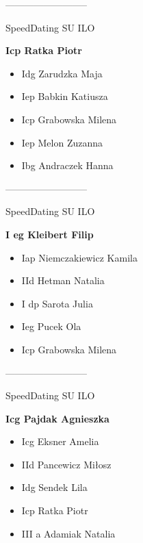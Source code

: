\documentclass[a4paper,10pt]{article}
\begin{document}
\begin{multicols}{3}
\begin{minipage}[l]{\textwidth}
--------------------------

  \footnotesize{SpeedDating SU ILO}

  \bfseries{Icp Ratka Piotr}

  \begin{itemize}
    \item Idg Zarudzka Maja
    \item Iep Babkin Katiusza
    \item Icp Grabowska Milena
    \item Iep Melon Zuzanna
    \item Ibg Andraczek Hanna

    \end{itemize}



\end{minipage}



\begin{minipage}[l]{\textwidth}
--------------------------

  \footnotesize{SpeedDating SU ILO}

  \bfseries{I eg Kleibert Filip}

  \begin{itemize}
    \item Iap Niemczakiewicz Kamila
    \item IId Hetman Natalia
    \item I dp Sarota Julia
    \item Ieg Pucek Ola
    \item Icp Grabowska Milena

    \end{itemize}



\end{minipage}



\begin{minipage}[l]{\textwidth}
--------------------------

  \footnotesize{SpeedDating SU ILO}

  \bfseries{Icg Pajdak Agnieszka}

  \begin{itemize}
    \item Icg Eksner Amelia
    \item IId Pancewicz Miłosz
    \item Idg Sendek Lila
    \item Icp Ratka Piotr
    \item III a Adamiak Natalia


\end{itemize}
\end{minipage}
\end{multicols}
\end{document}
